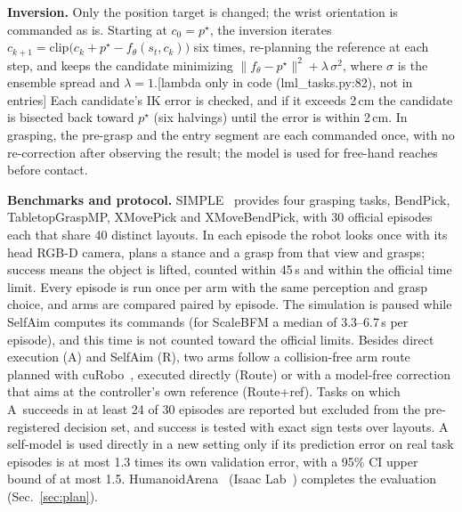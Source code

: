 \documentclass[conference]{IEEEtran}
\newif\ifdraft \drafttrue
\newcommand{\dnote}[1]{\ifdraft{\color{red}\footnotesize[#1]}\fi}
\newcommand{\Ad}{\textsc{A}}       %
\newcommand{\Rr}{\textsc{R}}       %
\begin{document}
\textbf{Inversion.} Only the position target is changed; the wrist orientation is commanded as is. Starting at $c_0=p^\star$, the inversion iterates $c_{k+1}=\mathrm{clip}\big(c_k+p^\star-f_\theta(s_t,c_k)\big)$ six times, re-planning the reference at each step, and keeps the candidate minimizing $\lVert f_\theta-p^\star\rVert^2+\lambda\,\sigma^2$, where $\sigma$ is the ensemble spread and $\lambda=1$.\dnote{lambda only in code (lml\_tasks.py:82), not in entries}
Each candidate's IK error is checked, and if it exceeds 2\,cm the candidate is bisected back toward $p^\star$ (six halvings) until the error is within 2\,cm. In grasping, the pre-grasp and the entry segment are each commanded once, with no re-correction after observing the result; the model is used for free-hand reaches before contact.

\textbf{Benchmarks and protocol.} SIMPLE~\cite{simple} provides four grasping tasks, BendPick, TabletopGraspMP, XMovePick and XMoveBendPick, with 30 official episodes each that share 40 distinct layouts. In each episode the robot looks once with its head RGB-D camera, plans a stance and a grasp from that view and grasps; success means the object is lifted, counted within 45\,s and within the official time limit. Every episode is run once per arm with the same perception and grasp choice, and arms are compared paired by episode. The simulation is paused while SelfAim computes its commands (for ScaleBFM a median of 3.3--6.7\,s per episode), and this time is not counted toward the official limits. Besides direct execution (\Ad) and SelfAim (\Rr), two arms follow a collision-free arm route planned with cuRobo~\cite{curobo}, executed directly (Route) or with a model-free correction that aims at the controller's own reference (Route+ref). Tasks on which \Ad\ succeeds in at least 24 of 30 episodes are reported but excluded from the pre-registered decision set, and success is tested with exact sign tests over layouts. A self-model is used directly in a new setting only if its prediction error on real task episodes is at most 1.3 times its own validation error, with a 95\% CI upper bound of at most 1.5. HumanoidArena~\cite{humanoidarena} (Isaac Lab~\cite{isaaclab}) completes the evaluation (Sec.~\ref{sec:plan}).
\end{document}
